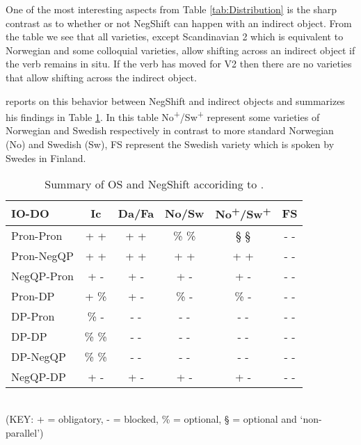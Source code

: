 \documentclass[12pt, letterpaper]{article}
\begin{document}
One of the most interesting aspects from Table \ref{tab:Distribution} is the sharp contrast as to whether or not NegShift can happen with an indirect object. From the table we see that all varieties, except Scandinavian 2 which is equivalent to Norwegian and some colloquial varieties, allow shifting across an indirect object if the verb remains in situ. If the verb has moved for V2 then there are no varieties that allow shifting across the indirect object.

\citet{christensenInterfacesNegationSyntax2005} reports on this behavior between NegShift and indirect objects and summarizes his findings in Table \ref{tab:OSNEGS}. In this table No\textsuperscript{+}/Sw\textsuperscript{+} represent some varieties of Norwegian and Swedish respectively in contrast to more standard Norwegian (No) and Swedish (Sw), FS represent the Swedish variety which is spoken by Swedes in Finland.
\begin{table}[h!]
\centering
\caption{Summary of OS and NegShift accoriding to \citet{christensenInterfacesNegationSyntax2005}.}
\label{tab:OSNEGS}
\begin{tabular}{lccccc}
\hline
IO-DO & Ic & Da/Fa & No/Sw & No\textsuperscript{+}/Sw\textsuperscript{+} & FS  \\
\hline 
Pron-Pron	&	+ +	&	+ +	&	\% \%	&	§ §	&	- -	\\
Pron-NegQP	&	+ +	&	+ +	&	+ +	&	+ +	&	- -	\\
NegQP-Pron	&	+ -	&	+ -	&	+ -	&	+ -	&	- -	\\
Pron-DP	&	+ \%	&	+ -	&	\% -	&	\% -	&	- -	\\
DP-Pron	&	\% -	&	- -	&	- -	&	- -	&	- -	\\
DP-DP	&	\% \%	&	- -	&	- -	&	- -	&	- -	\\
DP-NegQP	&	\% \%	&	- -	&	- -	&	- -	&	- -	\\
NegQP-DP	&	+ -	&	+ -	&	+ -	&	+ -	&	- -	\\
\hline 
\end{tabular}\\
(KEY: + = obligatory, - = blocked, \% = optional, § = optional and `non-parallel’)
\end{table}
\end{document}
